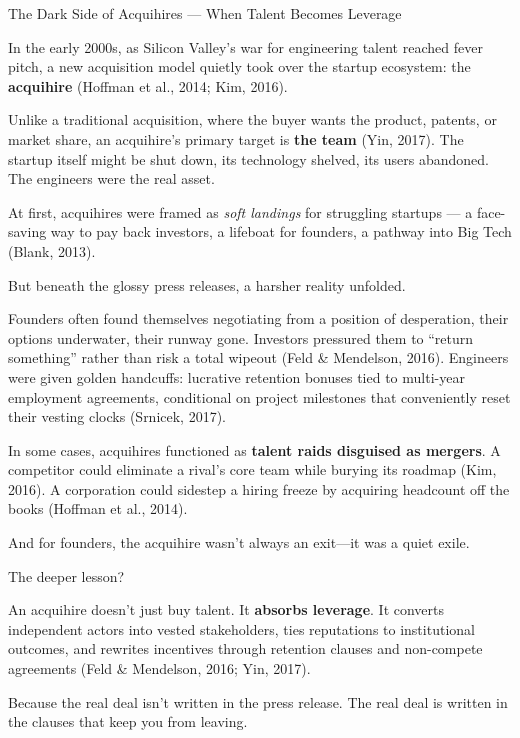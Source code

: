 \begin{HistoricalSidebar}{The Dark Side of Acquihires --- When Talent Becomes Leverage}

  In the early 2000s, as Silicon Valley’s war for engineering talent reached fever pitch, a new 
  acquisition model quietly took over the startup ecosystem: the \textbf{acquihire} 
  (Hoffman et al., 2014; Kim, 2016).

  \medskip
  
  Unlike a traditional acquisition, where the buyer wants the product, patents, or market share, 
  an acquihire’s primary target is \textbf{the team} (Yin, 2017). The startup itself might be shut down, 
  its technology shelved, its users abandoned. The engineers were the real asset.

  \medskip
  
  At first, acquihires were framed as \textit{soft landings} for struggling startups — a face-saving way 
  to pay back investors, a lifeboat for founders, a pathway into Big Tech (Blank, 2013).

  \medskip
  
  But beneath the glossy press releases, a harsher reality unfolded.

  \medskip
  
  Founders often found themselves negotiating from a position of desperation, their options underwater, 
  their runway gone. Investors pressured them to “return something” rather than risk a total wipeout 
  (Feld \& Mendelson, 2016). Engineers were given golden handcuffs: lucrative retention bonuses tied to 
  multi-year employment agreements, conditional on project milestones that conveniently reset their 
  vesting clocks (Srnicek, 2017).

  \medskip
  
  In some cases, acquihires functioned as \textbf{talent raids disguised as mergers}. A competitor could 
  eliminate a rival’s core team while burying its roadmap (Kim, 2016). A corporation could sidestep a 
  hiring freeze by acquiring headcount off the books (Hoffman et al., 2014).

  \medskip
  
  And for founders, the acquihire wasn’t always an exit—it was a quiet exile.

  \medskip
  
  The deeper lesson?

  \medskip
  
  An acquihire doesn’t just buy talent. It \textbf{absorbs leverage}. It converts independent actors 
  into vested stakeholders, ties reputations to institutional outcomes, and rewrites incentives through 
  retention clauses and non-compete agreements (Feld \& Mendelson, 2016; Yin, 2017).

  Because the real deal isn’t written in the press release.  
  The real deal is written in the clauses that keep you from leaving.
  
\end{HistoricalSidebar}



